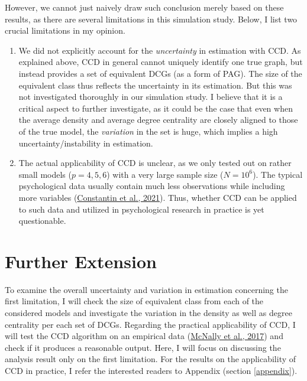 \documentclass[
]{article}
\begin{document}
\noindent However, we cannot just naively draw such conclusion merely based on these results, as there are several limitations in this simulation study. Below, I list two crucial limitations in my opinion.

\begin{enumerate}
\def\labelenumi{\arabic{enumi}.}
\item
  We did not explicitly account for the \emph{uncertainty} in estimation with CCD. As explained above, CCD in general cannot uniquely identify one true graph, but instead provides a set of equivalent DCGs (as a form of PAG). The size of the equivalent class thus reflects the uncertainty in its estimation. But this was not investigated thoroughly in our simulation study. I believe that it is a critical aspect to further investigate, as it could be the case that even when the average density and average degree centrality are closely aligned to those of the true model, the \emph{variation} in the set is huge, which implies a high uncertainty/instability in estimation.
\item
  The actual applicability of CCD is unclear, as we only tested out on rather small models (\(p = 4, 5, 6\)) with a very large sample size (\(N = 10^6\)). The typical psychological data usually contain much less observations while including more variables (\protect\hyperlink{ref-constantin_general_2021}{Constantin et al., 2021}). Thus, whether CCD can be applied to such data and utilized in psychological research in practice is yet questionable.
\end{enumerate}

\hypertarget{further-extension}{%
\section{Further Extension}\label{further-extension}}

\noindent To examine the overall uncertainty and variation in estimation concerning the first limitation, I will check the size of equivalent class from each of the considered models and investigate the variation in the density as well as degree centrality per each set of DCGs. Regarding the practical applicability of CCD, I will test the CCD algorithm on an empirical data (\protect\hyperlink{ref-mcnally2017}{McNally et al., 2017}) and check if it produces a reasonable output. Here, I will focus on discussing the analysis result only on the first limitation. For the results on the applicability of CCD in practice, I refer the interested readers to Appendix (section \ref{appendix}).
\end{document}
